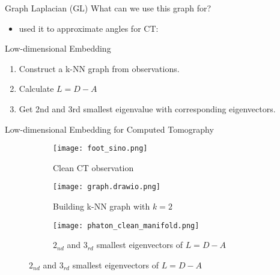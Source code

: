 \begin{frame}{Graph Laplacian (GL)}
  What can we use this graph for?
  \pause
  \begin{itemize}
  \item \cite{LaplaceRandomProjections} used it to approximate angles for CT:
\end{itemize}

\pause

\begin{block}{Low-dimensional Embedding}
  \begin{enumerate}
    \item Construct a k-NN graph from observations.
    \item Calculate $L = D - A $
    \item Get 2nd and 3rd smallest eigenvalue with corresponding eigenvectors.
  \end{enumerate}
\end{block}

\end{frame}


\begin{frame}{Low-dimensional Embedding for Computed Tomography}
  \begin{figure}
    \centering
    \begin{subfigure}[t]{0.25\textwidth}
        \texttt{[image: foot\_sino.png]}
        \caption{Clean CT observation}
    \end{subfigure} \hfill
    \pause
    \begin{subfigure}[t]{0.3\textwidth}
        \texttt{[image: graph.drawio.png]}
        \caption{Building k-NN graph with $ k = 2$ }
    \end{subfigure}\hfill
    \pause
    \begin{subfigure}[t]{0.3\textwidth}
      \texttt{[image: phaton\_clean\_manifold.png]}
      \caption{$2_{nd}$ and $3_{rd}$ smallest eigenvectors of  $L =  D - A$}
  \end{subfigure}
\end{figure}
  
\end{frame}


